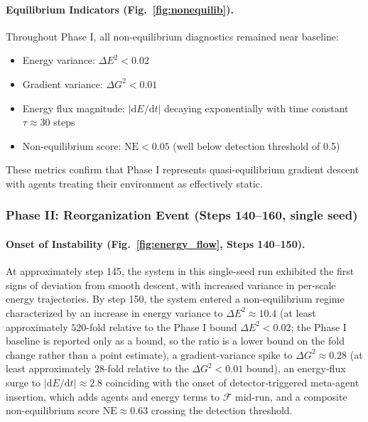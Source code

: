 \documentclass[11pt]{article}
\begin{document}
\paragraph{Equilibrium Indicators (Fig.~\ref{fig:nonequilib}).}
Throughout Phase I, all non-equilibrium diagnostics remained near baseline:
\begin{itemize}
\item Energy variance: $\Delta E^2 < 0.02$
\item Gradient variance: $\Delta G^2 < 0.01$
\item Energy flux magnitude: $|\mathrm{d}E/\mathrm{d}t|$ decaying exponentially with time constant $\tau \approx 30$ steps
\item Non-equilibrium score: $\mathrm{NE} < 0.05$ (well below detection threshold of 0.5)
\end{itemize}
These metrics confirm that Phase I represents quasi-equilibrium gradient descent with agents treating their environment as effectively static.

\subsubsection{Phase II: Reorganization Event (Steps 140--160, single seed)}

\paragraph{Onset of Instability (Fig.~\ref{fig:energy_flow}, Steps 140--150).}
At approximately step 145, the system in this single-seed run exhibited the first signs of deviation from smooth descent, with increased variance in per-scale energy trajectories. By step 150, the system entered a non-equilibrium regime characterized by an increase in energy variance to $\Delta E^2 \approx 10.4$ (at least approximately $520$-fold relative to the Phase I bound $\Delta E^2 < 0.02$; the Phase I baseline is reported only as a bound, so the ratio is a lower bound on the fold change rather than a point estimate), a gradient-variance spike to $\Delta G^2 \approx 0.28$ (at least approximately $28$-fold relative to the $\Delta G^2 < 0.01$ bound), an energy-flux surge to $|\mathrm{d}E/\mathrm{d}t| \approx 2.8$ coinciding with the onset of detector-triggered meta-agent insertion, which adds agents and energy terms to $\mathcal{F}$ mid-run, and a composite non-equilibrium score $\mathrm{NE} \approx 0.63$ crossing the detection threshold.
\end{document}
